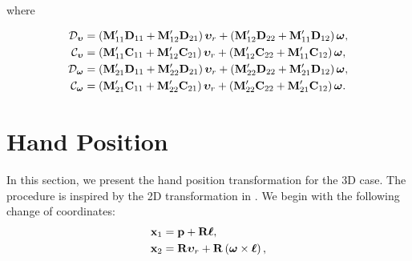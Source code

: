 \vspace*{-1.6em}

\noindent where

\vspace*{-1.7em}

\begin{subequations}
    \begin{align}
        \mathcal{D}_{\bm{\upsilon}} &= \left(\mathbf{M}_{11}^{\prime}\mathbf{D}_{11} + \mathbf{M}_{12}^{\prime}\mathbf{D}_{21}\right)\bm{\upsilon}_r + \left(\mathbf{M}_{12}^{\prime}\mathbf{D}_{22} + \mathbf{M}_{11}^{\prime}\mathbf{D}_{12}\right)\bm{\omega}, \\
        \mathcal{C}_{\bm{\upsilon}} &= \left(\mathbf{M}_{11}^{\prime}\mathbf{C}_{11} + \mathbf{M}_{12}^{\prime}\mathbf{C}_{21}\right)\bm{\upsilon}_r + \left(\mathbf{M}_{12}^{\prime}\mathbf{C}_{22} + \mathbf{M}_{11}^{\prime}\mathbf{C}_{12}\right)\bm{\omega}, \\
        \mathcal{D}_{\bm{\omega}} &= \left(\mathbf{M}_{21}^{\prime}\mathbf{D}_{11} + \mathbf{M}_{22}^{\prime}\mathbf{D}_{21}\right)\bm{\upsilon}_r + \left(\mathbf{M}_{22}^{\prime}\mathbf{D}_{22} + \mathbf{M}_{21}^{\prime}\mathbf{D}_{12}\right)\bm{\omega}, \\
        \mathcal{C}_{\bm{\omega}} &= \left(\mathbf{M}_{21}^{\prime}\mathbf{C}_{11} + \mathbf{M}_{22}^{\prime}\mathbf{C}_{21}\right)\bm{\upsilon}_r + \left(\mathbf{M}_{22}^{\prime}\mathbf{C}_{22} + \mathbf{M}_{21}^{\prime}\mathbf{C}_{12}\right)\bm{\omega}.
    \end{align} \label{eq:handpos_def_ode_components}
\end{subequations}

\vspace*{-1.7em}

\section{Hand Position}
\label{sec:handpos_def_hand_position}
\vspace*{-0.3em}

In this section, we present the hand position transformation for the 3D case.
The procedure is inspired by the 2D transformation in \cite{paliotta_trajectory_2019}.
We begin with the following change of coordinates: \vspace*{-0.5em}
\begin{subequations}
    \begin{align}
        \mathbf{x}_1 &= \mathbf{p} + \mathbf{R}\boldsymbol{\ell}, \label{eq:handpos_def_hand_position} \\
        \mathbf{x}_2 &= \mathbf{R}\bm{\upsilon}_r + \mathbf{R}\left(\bm{\omega} \times \boldsymbol{\ell}\right),
    \end{align} \label{eq:handpos_def_hand_transform_initial}
\end{subequations}


